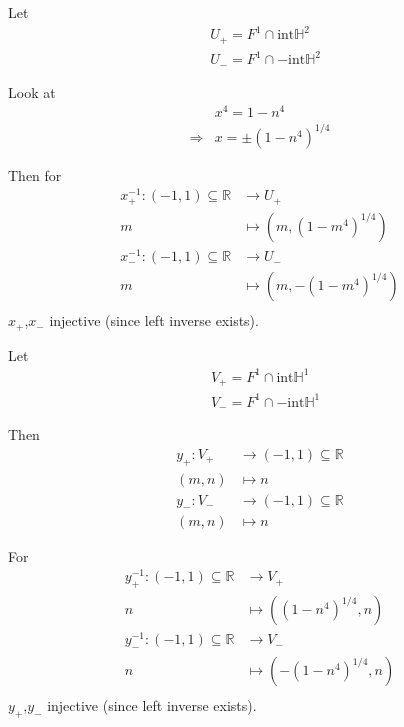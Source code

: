 
\solutionhead{}

Let 
\[
\begin{aligned}
& U_+ = F^1 \cap \text{int}\mathbb{H}^2 \\
& U_- = F^1 \cap -\text{int}\mathbb{H}^2
\end{aligned}
\]

Look at 
\[
\begin{aligned}
& x^4 = 1 - n^4 \\ 
\Longrightarrow & x = \pm ( 1 - n^4)^{1/4}
\end{aligned}
\]

Then for 
\[
\begin{aligned}
x_+^{-1}: (-1,1) \subseteq \mathbb{R} & \to U_+ \\ 
m & \mapsto (m,(1-m^4)^{1/4}) \\
x_-^{-1}: (-1,1) \subseteq \mathbb{R} & \to U_- \\ 
m & \mapsto (m,-(1-m^4)^{1/4}) \\
\end{aligned}
\]
$x_+$,$x_-$ injective (since left inverse exists).  



\solutionhead{}

Let 
\[
\begin{aligned}
& V_+ = F^1 \cap \text{int}\mathbb{H}^1 \\
& V_- = F^1 \cap -\text{int}\mathbb{H}^1
\end{aligned}
\]

Then
\[
\begin{aligned}
y_+:  V_+ & \to  (-1,1) \subseteq \mathbb{R} \\ 
(m,n) & \mapsto n \\
y_-: V_-  & \to  (-1,1) \subseteq \mathbb{R}  \\ 
(m,n) & \mapsto n
\end{aligned}
\]

\solutionhead{}


For 
\[
\begin{aligned}
y_+^{-1}: (-1,1) \subseteq \mathbb{R} & \to V_+ \\ 
n & \mapsto ((1-n^4)^{1/4},n) \\
y_-^{-1}: (-1,1) \subseteq \mathbb{R} & \to V_- \\ 
n & \mapsto (-(1-n^4)^{1/4},n) \\
\end{aligned}
\]
$y_+$,$y_-$ injective (since left inverse exists).  



